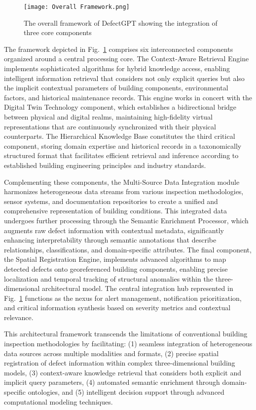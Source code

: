\documentclass[a4paper,fleqn]{cas-sc}
\begin{document}
\begin{figure}
\centering
\texttt{[image: Overall Framework.png]}
\caption{The overall framework of DefectGPT showing the integration of three core components}
\label{fig:framework}
\end{figure}


The framework depicted in Fig.~\ref{fig:framework} comprises six interconnected components organized around a central processing core. The Context-Aware Retrieval Engine implements sophisticated algorithms for hybrid knowledge access, enabling intelligent information retrieval that considers not only explicit queries but also the implicit contextual parameters of building components, environmental factors, and historical maintenance records. This engine works in concert with the Digital Twin Technology component, which establishes a bidirectional bridge between physical and digital realms, maintaining high-fidelity virtual representations that are continuously synchronized with their physical counterparts. The Hierarchical Knowledge Base constitutes the third critical component, storing domain expertise and historical records in a taxonomically structured format that facilitates efficient retrieval and inference according to established building engineering principles and industry standards.

Complementing these components, the Multi-Source Data Integration module harmonizes heterogeneous data streams from various inspection methodologies, sensor systems, and documentation repositories to create a unified and comprehensive representation of building conditions. This integrated data undergoes further processing through the Semantic Enrichment Processor, which augments raw defect information with contextual metadata, significantly enhancing interpretability through semantic annotations that describe relationships, classifications, and domain-specific attributes. The final component, the Spatial Registration Engine, implements advanced algorithms to map detected defects onto georeferenced building components, enabling precise localization and temporal tracking of structural anomalies within the three-dimensional architectural model. The central integration hub represented in Fig.~\ref{fig:framework} functions as the nexus for alert management, notification prioritization, and critical information synthesis based on severity metrics and contextual relevance.

This architectural framework transcends the limitations of conventional building inspection methodologies by facilitating: (1) seamless integration of heterogeneous data sources across multiple modalities and formats, (2) precise spatial registration of defect information within complex three-dimensional building models, (3) context-aware knowledge retrieval that considers both explicit and implicit query parameters, (4) automated semantic enrichment through domain-specific ontologies, and (5) intelligent decision support through advanced computational modeling techniques. 
\end{document}
